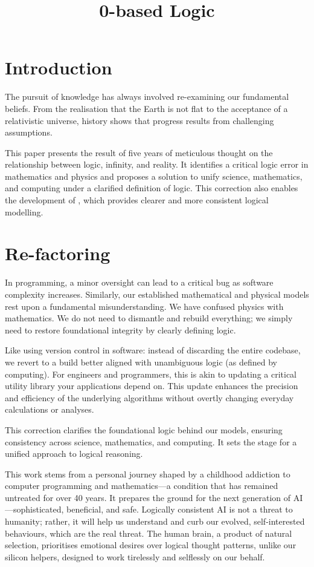 \documentclass{article}
\title{0-based Logic}
\date{}
\begin{document}
\maketitle

\section*{Introduction}
The pursuit of knowledge has always involved re-examining our fundamental beliefs. From the realisation that the Earth is not flat to the acceptance of a relativistic universe, history shows that progress results from challenging assumptions.

This paper presents the result of five years of meticulous thought on the relationship between logic, infinity, and reality. It identifies a critical logic error in mathematics and physics and proposes a solution to unify science, mathematics, and computing under a clarified definition of logic. This correction also enables the development of \iR{}, which provides clearer and more consistent logical modelling.

\section*{Re-factoring}

In programming, a minor oversight can lead to a critical bug as software complexity increases. Similarly, our established mathematical and physical models rest upon a fundamental misunderstanding. We have confused physics with mathematics. We do not need to dismantle and rebuild everything; we simply need to restore foundational integrity by clearly defining logic.

Like using version control in software: instead of discarding the entire codebase, we revert to a build better aligned with unambiguous logic (as defined by computing). For engineers and programmers, this is akin to updating a critical utility library your applications depend on. This update enhances the precision and efficiency of the underlying algorithms without overtly changing everyday calculations or analyses.

This correction clarifies the foundational logic behind our models, ensuring consistency across science, mathematics, and computing. It sets the stage for a unified approach to logical reasoning.

This work stems from a personal journey shaped by a childhood addiction to computer programming and mathematics—a condition that has remained untreated for over 40 years. It prepares the ground for the next generation of AI—sophisticated, beneficial, and safe. Logically consistent AI is not a threat to humanity; rather, it will help us understand and curb our evolved, self-interested behaviours, which are the real threat. The human brain, a product of natural selection, prioritises emotional desires over logical thought patterns, unlike our silicon helpers, designed to work tirelessly and selflessly on our behalf.
\end{document}
